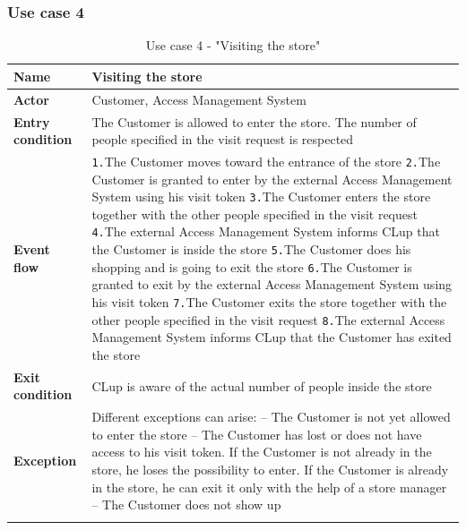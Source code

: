 \documentclass[a4paper,oneside,11pt]{book}   %
\begin{document}
    \subsubsection{Use case 4}
    \begin{longtable}[c] { |>{\bfseries{}}C{0.25\textwidth}|V{0.55\textwidth}| }
        \hline
        Name            & Visiting the store \\ \hline
        Actor           & Customer, Access Management System \\ \hline
        Entry condition & The Customer is allowed to enter the store. The number of people specified in the visit request is respected  \\ \hline
        Event flow      & 
        \texttt{1.}The Customer moves toward the entrance of the store \newline
        \texttt{2.}The Customer is granted to enter by the external Access Management System using his visit token \newline
        \texttt{3.}The Customer enters the store together with the other people specified in the visit request \newline
        \texttt{4.}The external Access Management System informs CLup that the Customer is inside the store \newline
        \texttt{5.}The Customer does his shopping and is going to exit the store \newline
        \texttt{6.}The Customer is granted to exit by the external Access Management System using his visit token \newline
        \texttt{7.}The Customer exits the store together with the other people specified in the visit request \newline
        \texttt{8.}The external Access Management System informs CLup that the Customer has exited the store
        \\ \hline
        Exit condition  & CLup is aware of the actual number of people inside the store \\ \hline
        Exception       & Different exceptions can arise: \newline
        -- The Customer is not yet allowed to enter the store \newline
        -- The Customer has lost or does not have access to his visit token. If the Customer is not already in the store, he loses the possibility to enter. If the Customer is already in the store, he can exit it only with the help of a store manager \newline
        -- The Customer does not show up \\
        \hline
    \caption{Use case 4 - "Visiting the store"}
    \label{table:use_case_04}
    \end{longtable}
    
\end{document}
